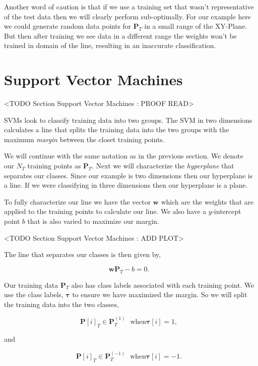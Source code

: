 Another word of caution is that if we use a training set that wasn't representative of the test data then we will clearly perform sub-optimally. For our example here we could generate random data points for $\mathbf{P}_T$ in a small range of the XY-Plane. But then after training we see data in a different range the weights won't be trained in domain of the line, resulting in an inaccurate classification.

	
\section{Support Vector Machines}
	<TODO Section Support Vector Machines : PROOF READ>
	
\ac{SVM}s look to classify training data into two groups. The \ac{SVM} in two dimensions calculates a line that splits the training data into the two groups with the maximum \emph{margin} between the closet training points. 

We will continue with the same notation as in the previous section. We denote our $N_T$ training points as $\mathbf{P}_T$. Next we will characterize the \emph{hyperplane} that separates our classes. Since our example is two dimensions then our hyperplane is a line. If we were classifying in three dimensions then our hyperplane is a plane. 

To fully characterize our line we have the vector $\mathbf{w}$ which are the weights that are applied to the training points to calculate our line. We also have a $y$-intercept point $b$ that is also varied to maximize our margin. 

<TODO Section Support Vector Machines : ADD PLOT>

The line that separates our classes is then given by,

\begin{equation}
\mathbf{w}\mathbf{P}_T - b = 0.
\end{equation}

Our training data $\mathbf{P}_T$ also has class labels associated with each training point. We use the class labels, $\mathbf{\tau}$ to ensure we have maximized the margin. So we will split the training data into the two classes, 

\begin{equation}
\mathbf{P}[i]_T \in \mathbf{P}^{(1)}_T ~~~ \text{when} \mathbf{\tau}[i] = 1,
\end{equation}
	
and

\begin{equation}
\mathbf{P}[i]_T \in \mathbf{P}^{(-1)}_T ~~~ \text{when} \mathbf{\tau}[i] = -1.
\end{equation}

